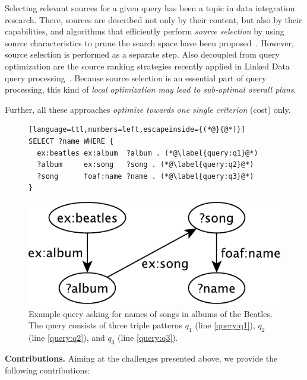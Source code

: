 Selecting relevant sources for a given query has been a topic in
data integration research. There, sources are described
not only by their content, but also by their capabilities, and
algorithms that efficiently perform \emph{source selection} by using
source characteristics to prune the search space have been
proposed~\cite{levy_querying_1996}. However, source selection is
performed as a separate step. Also decoupled from query optimization
are the source ranking strategies recently applied in Linked Data
query processing~\cite{harth_data_2010,ladwig_linked_2010}. Because
source selection is an essential part of query processing, this kind
of \emph{local optimization may lead to sub-optimal overall plans}.


Further, all these approaches \emph{optimize towards one single
  criterion} (cost) only.

\begin{figure}[ht]
  \centering
  \begin{minipage}{0.75\linewidth}
\begin{lstlisting}[language=ttl,numbers=left,escapeinside={(*@}{@*)}]
SELECT ?name WHERE {
  ex:beatles ex:album  ?album . (*@\label{query:q1}@*)
  ?album     ex:song   ?song . (*@\label{query:q2}@*)
  ?song      foaf:name ?name . (*@\label{query:q3}@*)
}
\end{lstlisting}
  \end{minipage}
  \includegraphics[width=0.7\linewidth]{figs/query-crop.pdf}
  \caption{Example query asking for names of songs in albums of the
    Beatles. The query consists of three triple patterns $q_1$ (line
    \ref{query:q1}), $q_2$ (line \ref{query:q2}), and $q_3$ (line
    \ref{query:q3}).}
  \label{fig:query}
\end{figure}

\textbf{Contributions.} Aiming at the challenges presented above, we
provide the following contributions:

